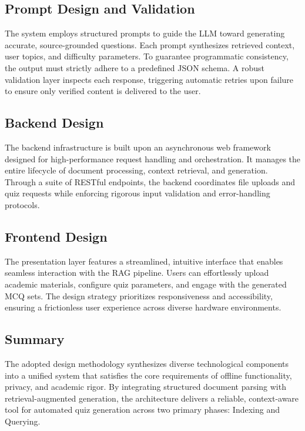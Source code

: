 \documentclass[12pt,a4paper]{report}
\begin{document}
\subsection{Prompt Design and Validation}
The system employs structured prompts to guide the LLM toward generating accurate, source-grounded questions. Each prompt synthesizes retrieved context, user topics, and difficulty parameters. To guarantee programmatic consistency, the output must strictly adhere to a predefined JSON schema. A robust validation layer inspects each response, triggering automatic retries upon failure to ensure only verified content is delivered to the user.
\subsection{Backend Design}
The backend infrastructure is built upon an asynchronous web framework designed for high-performance request handling and orchestration. It manages the entire lifecycle of document processing, context retrieval, and generation. Through a suite of RESTful endpoints, the backend coordinates file uploads and quiz requests while enforcing rigorous input validation and error-handling protocols.
\subsection{Frontend Design}
The presentation layer features a streamlined, intuitive interface that enables seamless interaction with the RAG pipeline. Users can effortlessly upload academic materials, configure quiz parameters, and engage with the generated MCQ sets. The design strategy prioritizes responsiveness and accessibility, ensuring a frictionless user experience across diverse hardware environments.
\subsection{Summary}
The adopted design methodology synthesizes diverse technological components into a unified system that satisfies the core requirements of offline functionality, privacy, and academic rigor. By integrating structured document parsing with retrieval-augmented generation, the architecture delivers a reliable, context-aware tool for automated quiz generation across two primary phases: Indexing and Querying.
\end{document}
